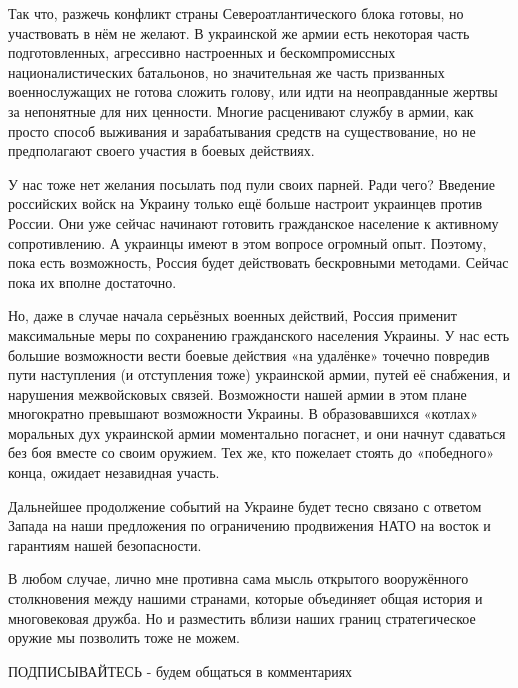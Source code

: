 Так что, разжечь конфликт страны Североатлантического блока готовы, но
участвовать в нём не желают. В украинской же армии есть некоторая часть
подготовленных, агрессивно настроенных и бескомпромиссных националистических
батальонов, но значительная же часть призванных военнослужащих не готова
сложить голову, или идти на неоправданные жертвы за непонятные для них
ценности. Многие расценивают службу в армии, как просто способ выживания и
зарабатывания средств на существование, но не предполагают своего участия в
боевых действиях.

У нас тоже нет желания посылать под пули своих парней. Ради чего? Введение
российских войск на Украину только ещё больше настроит украинцев против России.
Они уже сейчас начинают готовить гражданское население к активному
сопротивлению. А украинцы имеют в этом вопросе огромный опыт. Поэтому, пока
есть возможность, Россия будет действовать бескровными методами. Сейчас пока их
вполне достаточно.

Но, даже в случае начала серьёзных военных действий, Россия применит
максимальные меры по сохранению гражданского населения Украины. У нас есть
большие возможности вести боевые действия «на удалёнке» точечно повредив пути
наступления (и отступления тоже) украинской армии, путей её снабжения, и
нарушения межвойсковых связей. Возможности нашей армии в этом плане многократно
превышают возможности Украины. В образовавшихся «котлах» моральных дух
украинской армии моментально погаснет, и они начнут сдаваться без боя вместе со
своим оружием. Тех же, кто пожелает стоять до «победного» конца, ожидает
незавидная участь.

Дальнейшее продолжение событий на Украине будет тесно связано с ответом Запада
на наши предложения по ограничению продвижения НАТО на восток и гарантиям нашей
безопасности.

В любом случае, лично мне противна сама мысль открытого вооружённого
столкновения между нашими странами, которые объединяет общая история и
многовековая дружба. Но и разместить вблизи наших границ стратегическое оружие
мы позволить тоже не можем.

ПОДПИСЫВАЙТЕСЬ - будем общаться в комментариях
